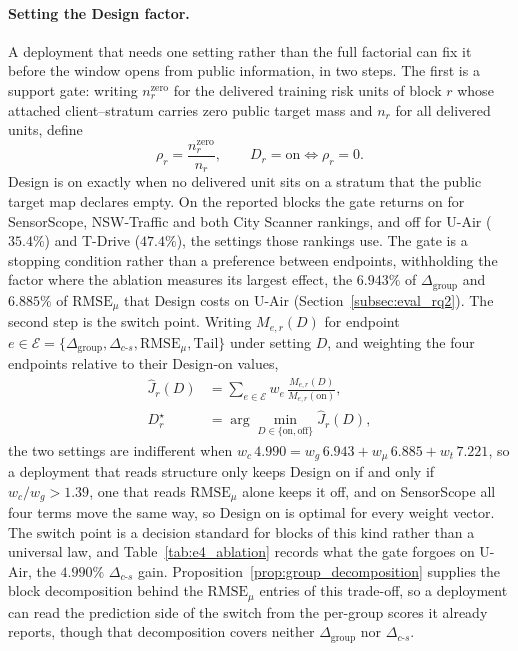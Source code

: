 \documentclass[letterpaper,journal]{IEEEtran}
\begin{document}
\paragraph{Setting the Design factor.}
A deployment that needs one setting rather than the full factorial can fix it
before the window opens from public information, in two steps.  The first is a
support gate: writing $n^{\mathrm{zero}}_r$ for the delivered training risk units
of block $r$ whose attached client--stratum carries zero public target mass and
$n_r$ for all delivered units, define
\begin{equation}
\rho_r=\frac{n^{\mathrm{zero}}_r}{n_r},
\qquad
D_r=\mathrm{on}\iff\rho_r=0 .
\label{eq:design_gate}
\end{equation}
Design is on exactly when no delivered unit sits on a stratum that the public
target map declares empty.  On the reported blocks the gate returns on for
SensorScope, NSW-Traffic and both City Scanner rankings, and off for U-Air
($35.4\%$) and T-Drive ($47.4\%$), the settings those rankings use.  The gate is
a stopping condition rather than a preference between endpoints, withholding the
factor where the ablation measures its largest effect, the $6.943\%$ of
$\Delta_{\mathrm{group}}$ and $6.885\%$ of $\mathrm{RMSE}_{\mu}$ that Design costs
on U-Air (Section~\ref{subsec:eval_rq2}).  The second step is the switch point.
Writing $M_{e,r}(D)$ for endpoint
$e\in\mathcal{E}=\{\Delta_{\mathrm{group}},\Delta_{c\text{-}s},
\mathrm{RMSE}_{\mu},\mathrm{Tail}\}$ under setting $D$, and weighting the four
endpoints relative to their Design-on values,
\begin{equation}
\begin{aligned}
\widehat J_r(D)&=\sum_{e\in\mathcal{E}}w_e\,\frac{M_{e,r}(D)}{M_{e,r}(\mathrm{on})},\\
D_r^{\star}&=\arg\min_{D\in\{\mathrm{on},\mathrm{off}\}}\widehat J_r(D),
\end{aligned}
\label{eq:design_switch}
\end{equation}
the two settings are indifferent when
$w_c\,4.990=w_g\,6.943+w_\mu\,6.885+w_t\,7.221$, so a deployment that reads
structure only keeps Design on if and only if $w_c/w_g>1.39$, one that reads
$\mathrm{RMSE}_{\mu}$ alone keeps it off, and on SensorScope all four terms move
the same way, so Design on is optimal for every weight vector.  The switch point
is a decision standard for blocks of this kind rather than a universal law, and
Table~\ref{tab:e4_ablation} records what the gate forgoes on U-Air, the $4.990\%$
$\Delta_{c\text{-}s}$ gain.  Proposition~\ref{prop:group_decomposition} supplies
the block decomposition behind the $\mathrm{RMSE}_{\mu}$ entries of this
trade-off, so a deployment can read the prediction side of the switch from the
per-group scores it already reports, though that decomposition covers neither
$\Delta_{\mathrm{group}}$ nor $\Delta_{c\text{-}s}$.
\end{document}
